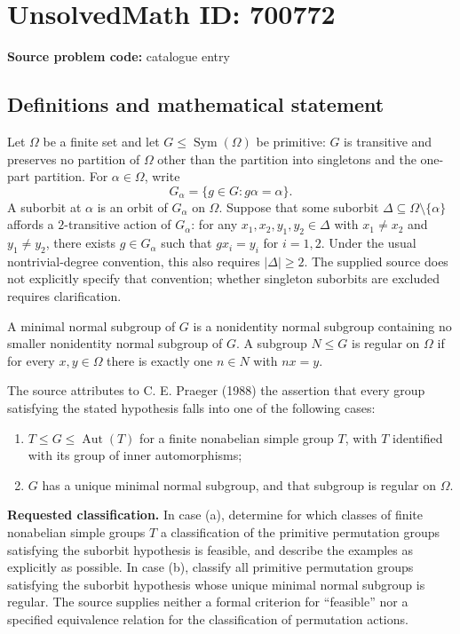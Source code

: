 \documentclass[11pt]{article}
\begin{document}
\section*{UnsolvedMath ID: 700772}
\textbf{Source problem code:} catalogue entry
\subsection{Definitions and mathematical statement}
Let \(\Omega\) be a finite set and let \(G\leq\operatorname{Sym}(\Omega)\) be primitive: \(G\) is transitive and preserves no partition of \(\Omega\) other than the partition into singletons and the one-part partition. For \(\alpha\in\Omega\), write
\[
G_\alpha=\{g\in G:g\alpha=\alpha\}.
\]
A suborbit at \(\alpha\) is an orbit of \(G_\alpha\) on \(\Omega\). Suppose that some suborbit \(\Delta\subseteq\Omega\setminus\{\alpha\}\) affords a \(2\)-transitive action of \(G_\alpha\): for any \(x_1,x_2,y_1,y_2\in\Delta\) with \(x_1\ne x_2\) and \(y_1\ne y_2\), there exists \(g\in G_\alpha\) such that \(gx_i=y_i\) for \(i=1,2\). Under the usual nontrivial-degree convention, this also requires \(|\Delta|\geq2\). The supplied source does not explicitly specify that convention; whether singleton suborbits are excluded requires clarification.

A minimal normal subgroup of \(G\) is a nonidentity normal subgroup containing no smaller nonidentity normal subgroup of \(G\). A subgroup \(N\leq G\) is regular on \(\Omega\) if for every \(x,y\in\Omega\) there is exactly one \(n\in N\) with \(nx=y\).

The source attributes to C. E. Praeger (1988) the assertion that every group satisfying the stated hypothesis falls into one of the following cases:
\begin{enumerate}
\item[(a)] \(T\leq G\leq\operatorname{Aut}(T)\) for a finite nonabelian simple group \(T\), with \(T\) identified with its group of inner automorphisms;
\item[(b)] \(G\) has a unique minimal normal subgroup, and that subgroup is regular on \(\Omega\).
\end{enumerate}
\textbf{Requested classification.} In case (a), determine for which classes of finite nonabelian simple groups \(T\) a classification of the primitive permutation groups satisfying the suborbit hypothesis is feasible, and describe the examples as explicitly as possible. In case (b), classify all primitive permutation groups satisfying the suborbit hypothesis whose unique minimal normal subgroup is regular. The source supplies neither a formal criterion for ``feasible'' nor a specified equivalence relation for the classification of permutation actions.
\end{document}
